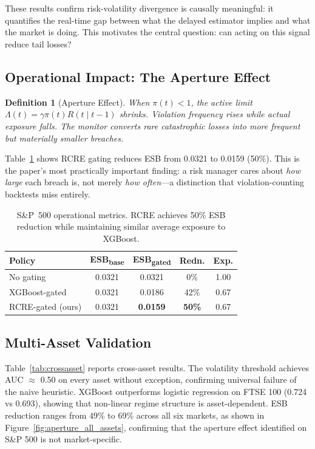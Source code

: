 \documentclass[sigconf, anonymous]{acmart}
\newtheorem{definition}{Definition}
\begin{document}
These results confirm risk-volatility divergence is causally
meaningful: it quantifies the real-time gap between what the delayed
estimator implies and what the market is doing. This motivates the
central question: can acting on this signal reduce tail losses?

\subsection{Operational Impact: The Aperture Effect}
\label{sec:aperture}

\begin{definition}[Aperture Effect]
When $\pi(t){<}1$, the active limit
$\Lambda(t){=}\gamma\pi(t)\hat{R}(t\mid t{-}1)$ shrinks. Violation
frequency rises while actual exposure falls. The monitor converts rare
catastrophic losses into more frequent but materially smaller breaches.
\end{definition}

Table~\ref{tab:operational} shows RCRE gating reduces ESB from 0.0321 to 0.0159 (50\%). This is the paper's most practically important
finding: a risk manager cares about \emph{how large} each breach is,
not merely \emph{how often}---a distinction that violation-counting
backtests miss entirely.

\begin{table}[t]
\caption{S\&P~500 operational metrics. RCRE achieves 50\% ESB reduction while maintaining similar average exposure to XGBoost.}
\label{tab:operational}
\small
\begin{tabular}{lcccc}
\toprule
\textbf{Policy} & \textbf{ESB\textsubscript{base}} & \textbf{ESB\textsubscript{gated}} & \textbf{Redn.} & \textbf{Exp.} \\
\midrule
No gating         & 0.0321 & 0.0321 & 0\%  & 1.00 \\
XGBoost-gated     & 0.0321 & 0.0186 & 42\% & 0.67 \\
RCRE-gated (ours) & 0.0321 & \textbf{0.0159} & \textbf{50\%} & 0.67 \\
\bottomrule
\end{tabular}
\end{table}

\subsection{Multi-Asset Validation}

Table~\ref{tab:crossasset} reports cross-asset results. The volatility threshold achieves AUC $\approx$ 0.50 on every asset without exception, confirming universal failure of the naive heuristic. XGBoost outperforms logistic regression on FTSE 100 (0.724 vs 0.693), showing that non-linear regime structure is asset-dependent. ESB reduction ranges from 49\% to 69\% across all six markets, as shown in Figure~\ref{fig:aperture_all_assets}, confirming that the aperture effect identified on S\&P 500 is not market-specific.
\end{document}
